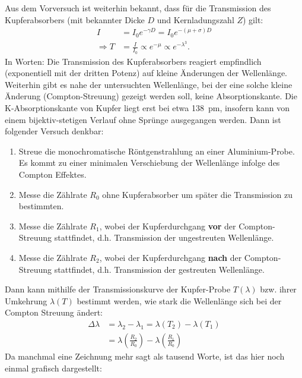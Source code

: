 \documentclass[ngerman,a4paper,twocolumn,twoside]{scrartcl}
\begin{document}
\par
Aus dem Vorversuch ist weiterhin bekannt, dass für die Transmission des Kupferabsorbers (mit bekannter Dicke $D$ und Kernladungszahl $Z$) gilt:
\begin{align}
I&=I_0e^{-\gamma{}D}=I_0e^{-(\mu+\sigma)D} \\
\Rightarrow T&=\frac{I}{I_0}\propto e^{-\mu} \propto e^{-\lambda^3}.
\end{align}
In Worten: Die Transmission des Kupferabsorbers reagiert empfindlich (exponentiell mit der dritten Potenz) auf kleine Änderungen der Wellenlänge. Weiterhin gibt es nahe der untersuchten Wellenlänge, bei der eine solche kleine Änderung (Compton-Streuung) gezeigt werden soll, keine Absorptionskante. Die K-Absorptionskante von Kupfer liegt erst bei etwa \SI{138}{\pico\meter}, insofern kann von einem bijektiv-stetigen Verlauf ohne Sprünge ausgegangen werden. Dann ist folgender Versuch denkbar:
\begin{enumerate}
\item Streue die monochromatische Röntgenstrahlung an einer Aluminium-Probe. Es kommt zu einer minimalen Verschiebung der Wellenlänge infolge des Compton Effektes.
\item Messe die Zählrate $R_0$ ohne Kupferabsorber um später die Transmission zu bestimmten.
\item Messe die Zählrate $R_1$,  wobei der Kupferdurchgang \textbf{vor} der Compton-Streuung stattfindet, d.h. Transmission der ungestreuten Wellenlänge.
\item Messe die Zählrate $R_2$, wobei der Kupferdurchgang \textbf{nach} der Compton-Streuung stattfindet, d.h. Transmission der gestreuten Wellenlänge.
\end{enumerate}
Dann kann mithilfe der Transmissionskurve der Kupfer-Probe $T(\lambda)$ bzw. ihrer Umkehrung $\lambda(T)$ bestimmt werden, wie stark die Wellenlänge sich bei der Compton Streuung ändert:
\begin{align}
\Delta\lambda&=\lambda_2 - \lambda_1=\lambda(T_2)-\lambda(T_1)\\&=\lambda\left(\frac{R_2}{R_0}\right)-\lambda\left(\frac{R_1}{R_0}\right)
\end{align}
Da manchmal eine Zeichnung mehr sagt als tausend Worte, ist das hier noch einmal grafisch dargestellt:
\end{document}
